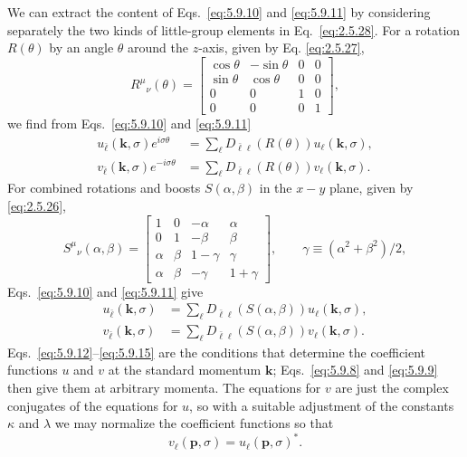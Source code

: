 We can extract the content of Eqs.~\eqref{eq:5.9.10} and \eqref{eq:5.9.11} by considering
separately the two kinds of little-group elements in Eq.~\eqref{eq:2.5.28}. For a
rotation $R(\theta)$ by an angle $\theta$ around the $z$-axis, given by Eq.
\eqref{eq:2.5.27},
\[
R^\mu{}_\nu(\theta)=
\begin{bmatrix}
\cos\theta&-\sin\theta&0&0\\
\sin\theta&\cos\theta&0&0\\
0&0&1&0\\
0&0&0&1
\end{bmatrix},
\]
we find from Eqs.~\eqref{eq:5.9.10} and \eqref{eq:5.9.11}
\begin{align}
u_{\bar\ell}(\mathbf k,\sigma)e^{i\sigma\theta}
&=\sum_\ell D_{\bar\ell\ell}(R(\theta))u_\ell(\mathbf k,\sigma),
\tag{5.9.12}\label{eq:5.9.12}\\
v_{\bar\ell}(\mathbf k,\sigma)e^{-i\sigma\theta}
&=\sum_\ell D_{\bar\ell\ell}(R(\theta))v_\ell(\mathbf k,\sigma).
\tag{5.9.13}\label{eq:5.9.13}
\end{align}
For combined rotations and boosts $S(\alpha,\beta)$ in the $x-y$ plane, given
by \eqref{eq:2.5.26},
\[
S^\mu{}_\nu(\alpha,\beta)=
\begin{bmatrix}
1&0&-\alpha&\alpha\\
0&1&-\beta&\beta\\
\alpha&\beta&1-\gamma&\gamma\\
\alpha&\beta&-\gamma&1+\gamma
\end{bmatrix},
\qquad \gamma\equiv(\alpha^2+\beta^2)/2,
\]
Eqs.~\eqref{eq:5.9.10} and \eqref{eq:5.9.11} give
\begin{align}
u_{\bar\ell}(\mathbf k,\sigma)&=
\sum_\ell D_{\bar\ell\ell}(S(\alpha,\beta))u_\ell(\mathbf k,\sigma),
\tag{5.9.14}\label{eq:5.9.14}\\
v_{\bar\ell}(\mathbf k,\sigma)&=
\sum_\ell D_{\bar\ell\ell}(S(\alpha,\beta))v_\ell(\mathbf k,\sigma).
\tag{5.9.15}\label{eq:5.9.15}
\end{align}
Eqs.~\eqref{eq:5.9.12}--\eqref{eq:5.9.15} are the conditions that determine the coefficient
functions $u$ and $v$ at the standard momentum $\mathbf k$; Eqs.~\eqref{eq:5.9.8} and
\eqref{eq:5.9.9} then give them at arbitrary momenta. The equations for $v$ are just the
complex conjugates of the equations for $u$, so with a suitable adjustment of
the constants $\kappa$ and $\lambda$ we may normalize the coefficient
functions so that
\begin{equation}
v_\ell(\mathbf p,\sigma)=u_\ell(\mathbf p,\sigma)^*.
\tag{5.9.16}\label{eq:5.9.16}
\end{equation}

